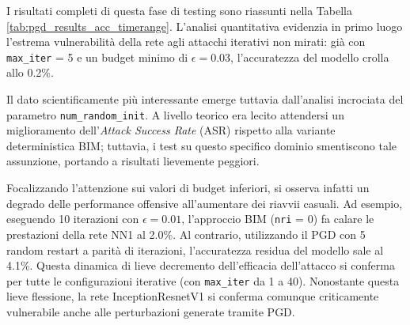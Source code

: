 \documentclass[a4paper, 12pt]{article}
\begin{document}
I risultati completi di questa fase di testing sono riassunti nella Tabella \ref{tab:pgd_results_acc_timerange}. L'analisi quantitativa evidenzia in primo luogo l'estrema vulnerabilità della rete agli attacchi iterativi non mirati: già con \texttt{max\_iter} = 5 e un budget minimo di $\epsilon = 0.03$, l'accuratezza del modello crolla allo 0.2\%. 

Il dato scientificamente più interessante emerge tuttavia dall'analisi incrociata del parametro \texttt{num\_random\_init}. A livello teorico era lecito attendersi un miglioramento dell'\textit{Attack Success Rate} (ASR) rispetto alla variante deterministica BIM; tuttavia, i test su questo specifico dominio smentiscono tale assunzione, portando a risultati lievemente peggiori.

Focalizzando l'attenzione sui valori di budget inferiori, si osserva infatti un degrado delle performance offensive all'aumentare dei riavvii casuali. Ad esempio, eseguendo 10 iterazioni con $\epsilon = 0.01$, l'approccio BIM (\texttt{nri} = 0) fa calare le prestazioni della rete NN1 al 2.0\%. Al contrario, utilizzando il PGD con 5 random restart a parità di iterazioni, l'accuratezza residua del modello sale al 4.1\%. 
Questa dinamica di lieve decremento dell'efficacia dell'attacco si conferma per tutte le configurazioni iterative (con \texttt{max\_iter} da 1 a 40). Nonostante questa lieve flessione, la rete InceptionResnetV1 si conferma comunque criticamente vulnerabile anche alle perturbazioni generate tramite PGD.
\end{document}
